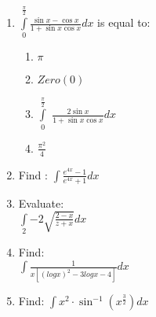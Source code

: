 \begin{enumerate}
	\item $\int\limits_0^{\frac{\pi}{2}} \frac{\sin x - \cos x}{1 + \sin x\cos x}dx$ is equal to:
		 \begin{enumerate}
			 \item $\pi$
			 \item $Zero(0)$
			 \item $\int\limits_0^{\frac{\pi}{2}}$ $\frac{2\sin x}{1+ \sin x\cos x}dx$
			 \item $\frac{\pi^{2}}{4}$
		 \end{enumerate}
	 \item Find : $\int \frac{e^{4x}-1}{e^{4x}+1}dx$
	 \item Evaluate:\\
		 $\int\limits_{2}{-2} \sqrt{\frac{2-x}{z+x}}dx$ 
	 \item Find: \\
		$\int \frac{1}{x[(logx)^{2} - 3logx - 4]}dx$
	\item Find: $\int x^{2} \cdot \sin^{-1} (x^{\frac{3}{2}})dx$ 
\end{enumerate}
